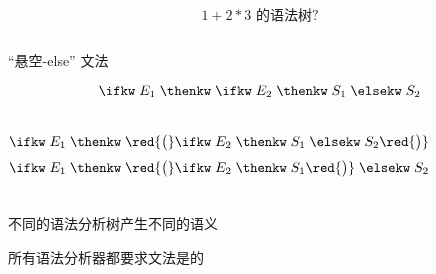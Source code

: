 \begin{frame}{}
  

  \[
    1 + 2 \ast 3 \text{ 的语法树?}
  \]

  \pause
  \begin{columns}
      \pause
  \end{columns}
\end{frame}

\begin{frame}{}
  \begin{center}
    ``悬空-else'' 文法
  \end{center}

  \[
    \ifkw\; E_{1} \;\thenkw\; \ifkw\; E_{2} \;\thenkw\; S_{1} \;\elsekw\; S_{2}
  \]

  \pause
  \begin{columns}
      \[
        \ifkw\; E_{1} \;\thenkw\; \red{\big(}\ifkw\; E_{2} \;\thenkw\; S_{1} \;\elsekw\; S_{2}\red{\big)}
      \]
      \[
        \ifkw\; E_{1} \;\thenkw\; \red{\big(}\ifkw\; E_{2} \;\thenkw\; S_{1}\red{\big)} \;\elsekw\; S_{2}
      \]
  \end{columns}
\end{frame}

\begin{frame}{}
  \begin{center}

    \vspace{0.60cm}
    不同的语法分析树产生不同的语义

  \end{center}
\end{frame}

\begin{frame}{}

  \begin{center}
    所有语法分析器都要求文法是的
  \end{center}
\end{frame}

